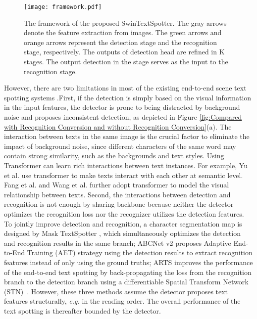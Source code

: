 \documentclass[10pt,twocolumn,letterpaper]{article}
\begin{document}
\begin{figure*}[htp]
    \centering
    \texttt{[image: framework.pdf]}
    \caption{
        The framework of the proposed SwinTextSpotter. The gray arrows denote the feature extraction from images. The green arrows and orange arrows represent the detection stage and the recognition stage, respectively. The outputs of detection head are refined in K stages. The output detection in the  stage serves as the input to the recognition stage.
    }
    \label{fig:frame}

\end{figure*}

However, there are two limitations in most of the existing end-to-end scene text spotting systems \cite{lyu2018mask,feng2019textdragon,qin2019towards,qiao2020text,wang2020all,liao2020mask,liu2020abcnet}.First, if the detection is simply based on the visual information in the input features, the detector is prone to being distracted by background noise and proposes inconsistent detection, as depicted in Figure \ref{fig:Compared with Recognition Conversion and without Recognition Conversion}(a).
The interaction between texts in the same image is the crucial factor to eliminate the impact of background noise, since different characters of the same word may contain strong similarity, such as the backgrounds and text styles. Using Transformer \cite{vaswani2017attention} can learn rich interactions between text instances.
For example, Yu et al. \cite{yu2020towards} use transformer to make texts interact with each other at semantic level. Fang et al. \cite{fang2021read} and Wang et al. \cite{wang2021two} further adopt transformer to model the visual relationship between texts.
Second, the interactions between detection and recognition is not enough by sharing backbone because neither the detector optimizes the recognition loss nor the recognizer utilizes the detection features.
To jointly improve detection and recognition, 
a character segmentation map is designed by Mask TextSpotter \cite{liao2020mask}, which simultaneously optimizes the detection and recognition results in the same branch; 
ABCNet v2 \cite{liu2021abcnetv2} proposes Adaptive End-to-End Training (AET) strategy using the detection results to extract recognition features instead of only using the ground truths;
ARTS \cite{zhong2021arts} improves the performance of the end-to-end text spotting by back-propagating the loss from the recognition branch to the detection branch using a differentiable Spatial Transform Network (STN)~\cite{2015Spatial}. 
However, these three methods assume the detector proposes text features structurally, \textit{e.g.} in the reading order. The overall performance of the text spotting is thereafter bounded by the detector.
\end{document}
